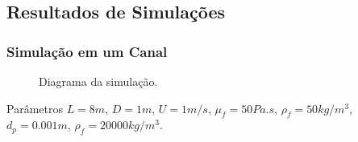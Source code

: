 \documentclass{beamer}
\begin{document}
\subsection{Resultados de Simulações}
\begin{frame}
  \frametitle{Simulação em um Canal}
  
  \begin{figure}
     {\raggedleft \tiny Diagrama da simulação.}
  \end{figure}
  \begin{block}{Parâmetros}
    $L=8m$, $D=1m$, $U=1m/s$, $\mu_f=50Pa.s$, $\rho_f=50kg/m^3$, $d_p=0.001m$, $\rho_f=20000kg/m^3$.
  \end{block}
\end{frame}
\end{document}
